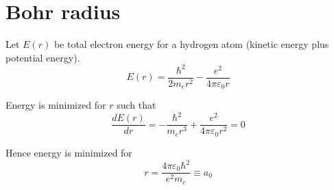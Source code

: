 

\section*{Bohr radius}

Let $E(r)$ be total electron energy for a hydrogen atom (kinetic energy plus potential energy).
\begin{equation*}
E(r)=\frac{\hbar^2}{2m_er^2}-\frac{e^2}{4\pi\varepsilon_0r}
\end{equation*}

Energy is minimized for $r$ such that
\begin{equation*}
\frac{dE(r)}{dr}=-\frac{\hbar^2}{m_er^3}+\frac{e^2}{4\pi\varepsilon_0r^2}=0
\end{equation*}

Hence energy is minimized for
\begin{equation*}
r=\frac{4\pi\varepsilon_0\hbar^2}{e^2m_e}\equiv a_0
\end{equation*}


